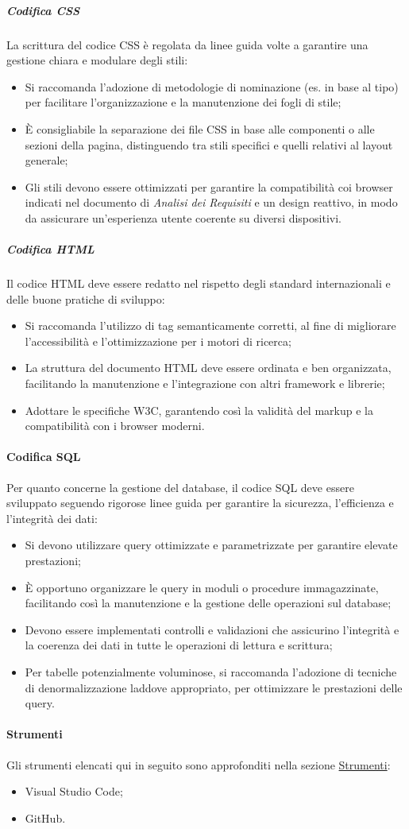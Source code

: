 \subparagraph{Codifica CSS}
La scrittura del codice CSS è regolata da linee guida volte a garantire una gestione chiara e modulare degli stili:
\begin{itemize}
    \item Si raccomanda l'adozione di metodologie di nominazione (es. in base al tipo) per facilitare l'organizzazione e la manutenzione dei fogli di stile;
    \item È consigliabile la separazione dei file CSS in base alle componenti o alle sezioni della pagina, distinguendo tra stili specifici e quelli relativi al layout generale;
    \item Gli stili devono essere ottimizzati per garantire la compatibilità coi browser indicati nel documento di \textit{Analisi dei Requisiti} e un design reattivo, in modo da assicurare un'esperienza utente coerente su diversi dispositivi.
\end{itemize}

\subparagraph{Codifica HTML}
Il codice HTML deve essere redatto nel rispetto degli standard internazionali e delle buone pratiche di sviluppo:
\begin{itemize}
    \item Si raccomanda l'utilizzo di tag semanticamente corretti, al fine di migliorare l'accessibilità e l'ottimizzazione per i motori di ricerca;
    \item La struttura del documento HTML deve essere ordinata e ben organizzata, facilitando la manutenzione e l'integrazione con altri framework e librerie;
    \item Adottare le specifiche W3C, garantendo così la validità del markup e la compatibilità con i browser moderni.
\end{itemize}

\paragraph{Codifica SQL}
Per quanto concerne la gestione del database, il codice SQL deve essere sviluppato seguendo rigorose linee guida per garantire la sicurezza, l'efficienza e l'integrità dei dati:
\begin{itemize}
    \item Si devono utilizzare query ottimizzate e parametrizzate per garantire elevate prestazioni;
    \item È opportuno organizzare le query in moduli o procedure immagazzinate, facilitando così la manutenzione e la gestione delle operazioni sul database;
    \item Devono essere implementati controlli e validazioni che assicurino l'integrità e la coerenza dei dati in tutte le operazioni di lettura e scrittura;
    \item Per tabelle potenzialmente voluminose, si raccomanda l'adozione di tecniche di denormalizzazione laddove appropriato, per ottimizzare le prestazioni delle query.
\end{itemize}

\paragraph{Strumenti}
Gli strumenti elencati qui in seguito sono approfonditi nella sezione \hyperref[sec:strumenti]{Strumenti}:
\begin{itemize}
    \item Visual Studio Code;
    \item GitHub.
\end{itemize}